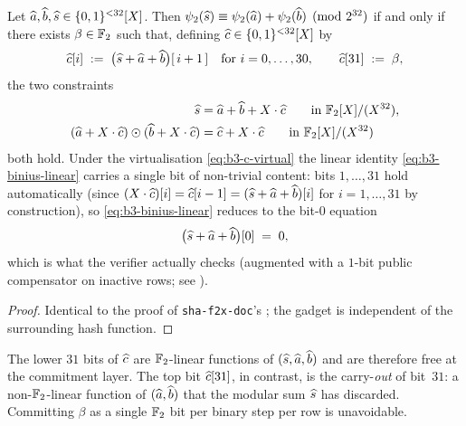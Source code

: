 \begin{lemma}
\label{lem:b3-binius-vc}
Let $\widehat{a}, \widehat{b}, \widehat{s} \in \{0,1\}^{<32}[X]$. Then
$\psi_2(\widehat{s}) \equiv \psi_2(\widehat{a}) + \psi_2(\widehat{b}) \pmod{2^{32}}$
if and only if there exists $\beta \in \mathbb{F}_2$ such that, defining
$\widehat{c} \in \{0,1\}^{<32}[X]$ by
\begin{equation}\label{eq:b3-c-virtual}
\widehat{c}[i] \;:=\; \bigl(\widehat{s} + \widehat{a} + \widehat{b}\bigr)[\,i+1\,]
\quad \text{for } i = 0,\dots,30, \qquad
\widehat{c}[31] \;:=\; \beta,
\end{equation}
the two constraints
\begin{align}
\widehat{s} &= \widehat{a} + \widehat{b} + X\cdot\widehat{c} \qquad \text{in } \mathbb{F}_2[X]/(X^{32}), \label{eq:b3-binius-linear}\\
(\widehat{a} + X\cdot\widehat{c}) \odot (\widehat{b} + X\cdot\widehat{c})
   &= \widehat{c} + X\cdot\widehat{c} \qquad \text{in } \mathbb{F}_2[X]/(X^{32}) \label{eq:b3-binius-had}
\end{align}
both hold. Under the virtualisation \eqref{eq:b3-c-virtual} the linear
identity \eqref{eq:b3-binius-linear} carries a single bit of
non-trivial content: bits $1, \dots, 31$ hold automatically (since
$(X\cdot\widehat{c})[i] = \widehat{c}[i-1] = (\widehat{s} + \widehat{a} + \widehat{b})[i]$ for
$i = 1, \dots, 31$ by construction), so \eqref{eq:b3-binius-linear}
reduces to the bit-$0$ equation
\begin{equation}\label{eq:b3-binius-lsb}
\bigl(\widehat{s} + \widehat{a} + \widehat{b}\bigr)[0] \;=\; 0,
\end{equation}
which is what the verifier actually checks (augmented with a $1$-bit
public compensator on inactive rows; see ).
\end{lemma}

\begin{proof}
Identical to the proof of \texttt{sha-f2x-doc}'s
; the gadget is independent of the surrounding
hash function.
\end{proof}

\begin{remark}\label{rem:b3-beta-needed}
The lower $31$ bits of $\widehat{c}$ are $\mathbb{F}_2$-linear functions of
$(\widehat{s}, \widehat{a}, \widehat{b})$ and are therefore free at the commitment
layer. The top bit $\widehat{c}[31]$, in contrast, is the
carry-\emph{out} of bit~$31$: a non-$\mathbb{F}_2$-linear function of
$(\widehat{a}, \widehat{b})$ that the modular sum $\widehat{s}$ has discarded.
Committing $\beta$ as a single $\mathbb{F}_2$ bit per binary step per row is
unavoidable.
\end{remark}

